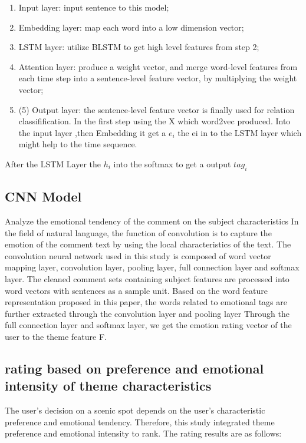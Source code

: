 \documentclass[conference]{IEEEtran}
\begin{document}
\begin{enumerate}
    \item Input layer: input sentence to this model; 
    \item Embedding layer: map each word into a low dimension vector; 
    \item LSTM layer: utilize BLSTM to get high level features from step 2; 
    \item Attention layer: produce a weight vector, and merge word-level features from each time step into a sentence-level feature vector, by multiplying the weight vector; 
    \item (5) Output layer: the sentence-level feature vector is finally used for relation classifification. 
    In the first step using the X which word2vec produced. Into the input layer ,then Embedding it get a $e_i$ the ei in to the LSTM layer which might help to the time sequence.
\end{enumerate}
After the LSTM Layer the $h_i$ into the softmax to get a output $tag_i$

\subsection{CNN Model}
Analyze the emotional tendency of the comment on the subject characteristics
In the field of natural language, the function of convolution is to capture the emotion of the comment text by using the local characteristics of the text. The convolution neural network used in this study is composed of word vector mapping layer, convolution layer, pooling layer, full connection layer and softmax layer. The cleaned comment sets containing subject features are processed into word vectors with sentences as a sample unit. Based on the word feature representation proposed in this paper, the words related to emotional tags are further extracted through the convolution layer and pooling layer Through the full connection layer and softmax layer, we get the emotion rating vector of the user to the theme feature F.

\subsection{rating based on preference and emotional intensity of theme characteristics}
The user's decision on a scenic spot depends on the user's characteristic preference and emotional tendency. Therefore, this study integrated theme preference and emotional intensity to rank. The rating results are as follows:
\end{document}
